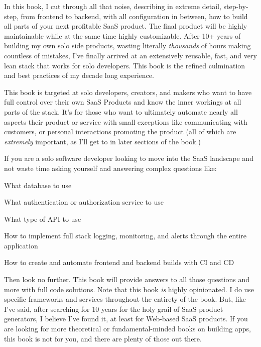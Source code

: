 \documentclass[a4paper,
                             oneside,
                             BCOR1.0cm,
                             DIV11,
                             parskip=full,
                             11pt]{scrbook}
\begin{document}
In this book, I cut through all that noise, describing in extreme detail, step-by-step, from frontend to backend, with all configuration in between, how to build all parts of your next profitable SaaS product. The final product will be highly maintainable while at the same time highly customizable.  After 10+ years of building my own solo side products, wasting literally \textit{thousands} of hours making countless of mistakes, I've finally arrived at an extensively reusable, fast, and very lean stack that works for solo developers. This book is the refined culmination and best practices of my decade long experience.


This book is targeted at solo developers, creators, and makers who want to have full control over their own SaaS Products and know the inner workings at all parts of the stack. It's for those who want to ultimately automate nearly all aspects their product or service with small exceptions like communicating with customers, or personal interactions promoting the product (all of which are \textit{extremely} important, as I'll get to in later sections of the book.)

If you are a solo software developer looking to move into the SaaS landscape and not waste time asking yourself and answering complex questions like:

\begin{arrows}
\item What database to use
\item What authentication or authorization service to use
\item What type of API to use
\item How to implement full stack logging, monitoring, and alerts through the entire application
\item How to create and automate frontend and backend builds with CI and CD
\end{arrows}

Then look no further. This book will provide answers to all those questions and more with full code solutions. Note that this book \textit{is} highly opinionated. I do use specific frameworks and services throughout the entirety of the book. But, like I've said, after searching for 10 years for the holy grail of SaaS product generators, I believe I've found it, at least for Web-based SaaS products. If you are looking for more theoretical or fundamental-minded books on building apps, this book is not for you, and there are plenty of those out there.
\end{document}
